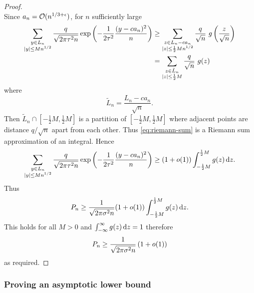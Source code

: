 \begin{proof}
\begin{equation*}
    \end{equation*}
    Since $a_n = \mathcal O(n^{1/3 + \epsilon})$, for $n$ sufficiently large
    \begin{align}
        \sum_{\substack{y \in L_n \\ \lvert y\rvert \leq M n^{1/2}}}
        \frac{q}{\sqrt{2 \pi \tau^2 n}} \exp \left( - \frac{1}{2 \tau^2} \frac{(y - ca_n)^2}{n} \right)
        &\geq \sum_{\substack{z \in L_n - ca_n\\ \lvert z\rvert \leq \frac{1}{2} M n^{1/2}}} 
        \frac{q}{\sqrt{n}}\ g \left( \frac{z}{\sqrt{n}} \right) \\
        &= \sum_{\substack{z \in \tilde{L}_n \\ \lvert z\rvert \leq \frac{1}{2} M }}
        \frac{q}{\sqrt{n}}\ g(z) \label{eq:riemann-sum}
    \end{align}
    where
    \begin{equation*}
        \tilde{L}_n = \frac{L_n - ca_n}{\sqrt{n}}.
    \end{equation*}
    Then $\tilde{L}_n \cap [-\frac{1}{2}M, \frac{1}{2}M]$ is a partition of $[-\frac{1}{2}M, \frac{1}{2}M]$ where adjacent points are distance $q/\sqrt{n}$ apart from each other. Thus \cref{eq:riemann-sum} is a Riemann sum approximation of an integral. Hence
    \begin{equation*}
        \sum_{\substack{y \in L_n \\ \lvert y\rvert \leq M n^{1/2}}}
        \frac{q}{\sqrt{2 \pi \tau^2 n}} \exp \left( - \frac{1}{2 \tau^2} \frac{(y - ca_n)^2}{n} \right)
        \geq (1 + o(1)) \int_{-\frac{1}{2} M}^{\frac{1}{2}M} g(z) \mathop{}\!\mathrm{d} z.
    \end{equation*}
    Thus
    \begin{equation*}
        P_n \geq \frac{1}{\sqrt{2 \pi \sigma^2 n}} (1 + o(1)) \int_{-\frac{1}{2} M}^{\frac{1}{2}M} g(z) \mathop{}\!\mathrm{d} z.
    \end{equation*}
    This holds for all $M > 0$ and $\int_{-\infty}^{\infty} g(z) \mathop{}\!\mathrm{d} z = 1$ therefore 
    \begin{equation*}
        P_n \geq \frac{1}{\sqrt{2 \pi \sigma^2 n}} \left( 1 + o(1) \right)
    \end{equation*}
    as required.
\end{proof}

\subsubsection{Proving an asymptotic lower bound}

